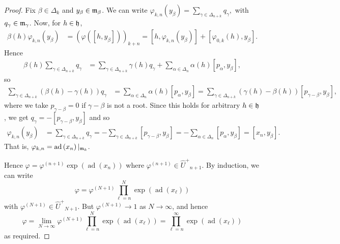 \documentclass[11pt,letterpaper]{amsart}
\numberwithin{thecounter}{section}
\theoremstyle{definition}
\DeclareMathOperator{\ad}{ad}
\renewcommand{\a}{\alpha}
\renewcommand{\b}{\beta}
\newcommand{\g}{\gamma}
\newcommand{\Uhp}{{\widehat{U}^+}}
\begin{document}
\begin{shortver}
\begin{proof}
Fix  $\b\in\Delta_k$ and $y_{\b}\in\frak m_\b$.
We can write
$ \varphi_{k,n}\left(y_{\b}\right)= \sum_{\g\in\Delta_{n+k}} q_\g,$
with $q_\g\in\frak m_\g$.
Now, for $h\in\frak h$,
\begin{align*}
\b\left(h\right) \varphi_{k,n}\left(y_{\b}\right) &= 
\left(\varphi\left(\left[h,y_{\b}\right]\right)\right)_{k+n} 
 = \left[h, \varphi_{k,n}\left(y_{\b}\right)\right] + \left[ \varphi_{0,k}\left(h\right), y_{\b}\right].
\end{align*}
Hence
\begin{align*}
 \b\left(h\right) \sum_{\g\in\Delta_{n+k}}   q_{\g}
 &= \sum_{\g\in\Delta_{n+k}} \g\left(h\right) q_{\g}  + 
 \sum_{\a\in\Delta_n}  \a\left(h\right) \left[p_{\a},y_{\b}\right],
\end{align*}
so
\begin{align*}
  \sum_{\g\in\Delta_{n+k}}  \left(\b(h)-\g(h)\right) q_{\g}&=  \sum_{\a\in\Delta_n}  \a(h) \left[p_{\a},y_{\b}\right]
  = \sum_{\g\in\Delta_{n+k}}  \left(\g(h)-\b(h)\right)  \left[p_{\g-\b},y_{\b}\right],
\end{align*}
where we take $p_{\g-\b}=0$ if $\g-\b$ is not a root.
Since this holds for arbitrary $h\in\frak h$,  we get $q_{\g} = -\left[p_{\g-\b},y_{\b}\right]$ and so
\begin{align*}
 \varphi_{k,n}\left(y_{\b}\right) &= \sum_{\g\in\Delta_{n+k}}q_\g 
=- \sum_{\g\in\Delta_{n+k}}  \left[p_{\g-\b},y_{\b}\right] 
= - \sum_{\a\in\Delta_{n}} \left[p_{\a}, y_{\b}\right]=\left[x_n,y_{\b}\right].
\end{align*}
That is, $ \varphi_{k,n}=\ad\left(x_n\right)|_{{\frak m}_k}$.

Hence $\varphi = \varphi^{(n+1)}\exp\left(\ad\left(x_n\right)\right)$ where  $\varphi^{(n+1)}\in\Uhp_{n+1}$. 
By induction, we can write
$$\varphi =\varphi^{(N+1)} \prod_{\ell=n}^N \exp\left(\ad\left(x_\ell\right)\right) $$
with $\varphi^{(N+1)}\in \Uhp_{N+1}$.
But $\varphi^{(N+1)}\to1$ as $N\to\infty$, and hence
$$\varphi=\lim_{N\to\infty}  \varphi^{(N+1)}\prod_{\ell=n}^N \exp\left(\ad\left(x_\ell\right)\right) %
 = \prod_{\ell=n}^\infty \exp\left(\ad\left(x_\ell\right)\right)$$
as required.
\end{proof}
\end{shortver}
\end{document}
